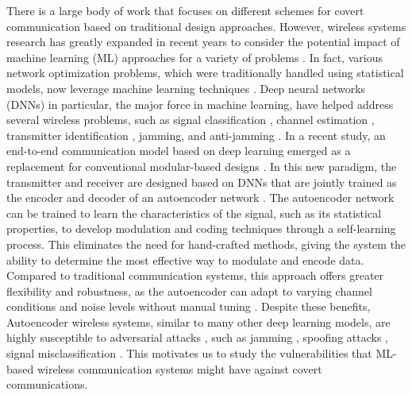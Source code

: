 There is a large body of work that focuses on different schemes for covert communication based on traditional design approaches. However, wireless systems research has greatly expanded in recent years to consider the potential impact of machine learning (ML) approaches for a variety of problems \cite{wang2017deep}. In fact, various network optimization problems, which were traditionally handled using statistical models, now leverage machine learning techniques \cite{zhu2020toward}. Deep neural networks (DNNs) in particular, the major force in machine learning, have helped address several wireless problems, such as signal classification \cite{o2016radio, o2017introduction, wu2020deep, makkuva2021ko}, channel estimation \cite{soltani2019deep}, transmitter identification \cite{roy2019rfal, hanna2019deep}, jamming, and anti-jamming \cite{arjoune2020novel, bahramali2021robust}. In a recent study, an end-to-end communication model based on deep learning emerged as a replacement for conventional modular-based designs \cite{o2017introduction}. In this new paradigm, the transmitter and receiver are designed based on DNNs that are jointly trained as the encoder and decoder of an autoencoder network \cite{o2017introduction}. The autoencoder network can be trained to learn the characteristics of the signal, such as its statistical properties, to develop modulation and coding techniques through a self-learning process. This eliminates the need for hand-crafted methods, giving the system the ability to determine the most effective way to modulate and encode data. Compared to traditional communication systems, this approach offers greater flexibility and robustness, as the autoencoder can adapt to varying channel conditions and noise levels without manual tuning \cite{zou2021channel}. Despite these benefits, Autoencoder wireless systems, similar to many other deep learning models, are highly susceptible to adversarial attacks \cite{chakraborty2018adversarial}, such as jamming \cite{bahramali2021robust}, spoofing attacks \cite{shi2020generative}, signal misclassification \cite{sadeghi2019physical}. This motivates us to study the vulnerabilities that ML-based wireless communication systems might have against covert communications.

